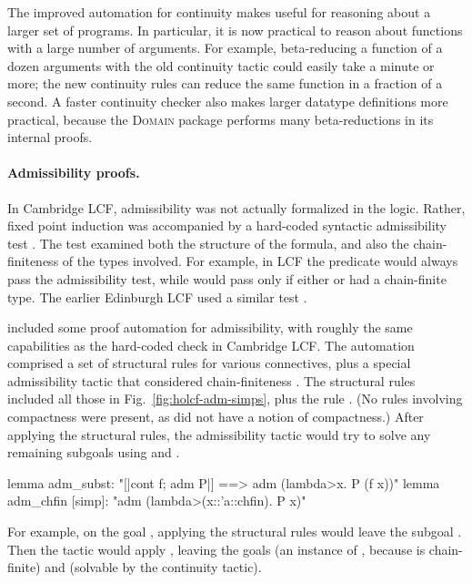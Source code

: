 The improved automation for continuity makes  useful for reasoning about a larger set of programs. In particular, it is now practical to reason about functions with a large number of arguments. For example, beta-reducing a function of a dozen arguments with the old continuity tactic could easily take a minute or more; the new continuity rules can reduce the same function in a fraction of a second. A faster continuity checker also makes larger datatype definitions more practical, because the \textsc{Domain} package performs many beta-reductions in its internal proofs.

\paragraph{Admissibility proofs.} In Cambridge LCF, admissibility was not actually formalized in the logic. Rather, fixed point induction was accompanied by a hard-coded syntactic admissibility test \cite[page 200]{paulson87lcf}. The test examined both the structure of the formula, and also the chain-finiteness of the types involved. For example, in LCF the predicate  would always pass the admissibility test, while  would pass only if either  or  had a chain-finite type. The earlier Edinburgh LCF used a similar test \cite[page 77]{GMW79}.

 included some proof automation for admissibility, with roughly the same capabilities as the hard-coded check in Cambridge LCF. The automation comprised a set of structural rules for various connectives, plus a special admissibility tactic that considered chain-finiteness \cite{hol+lcf, mueller98thesis}. The structural rules included all those in Fig.~\ref{fig:holcf-adm-simps}, plus the rule . (No rules involving compactness were present, as  did not have a notion of compactness.) After applying the structural rules, the admissibility tactic would try to solve any remaining subgoals using  and .

\begin{isacodes}
lemma adm_subst: "[|cont f; adm P|] ==> adm (\<lambda>x. P (f x))"
lemma adm_chfin [simp]: "adm (\<lambda>(x::'a::chfin). P x)"
\end{isacodes}

\noindent
For example, on the goal , applying the structural rules would leave the subgoal . Then the tactic would apply , leaving the goals  (an instance of , because  is chain-finite) and  (solvable by the continuity tactic).

